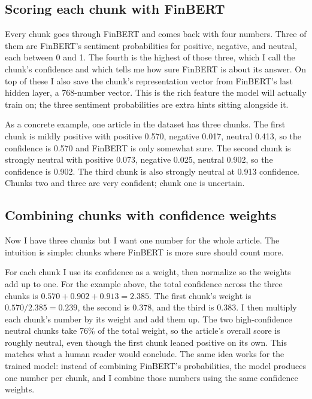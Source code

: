 \documentclass[11pt]{article}
\begin{document}
\subsection{Scoring each chunk with FinBERT}

Every chunk goes through FinBERT and comes back with four numbers. Three of them are FinBERT's sentiment probabilities for positive, negative, and neutral, each between 0 and 1. The fourth is the highest of those three, which I call the chunk's confidence and which tells me how sure FinBERT is about its answer. On top of these I also save the chunk's representation vector from FinBERT's last hidden layer, a 768-number vector. This is the rich feature the model will actually train on; the three sentiment probabilities are extra hints sitting alongside it.

As a concrete example, one article in the dataset has three chunks. The first chunk is mildly positive with positive 0.570, negative 0.017, neutral 0.413, so the confidence is 0.570 and FinBERT is only somewhat sure. The second chunk is strongly neutral with positive 0.073, negative 0.025, neutral 0.902, so the confidence is 0.902. The third chunk is also strongly neutral at 0.913 confidence. Chunks two and three are very confident; chunk one is uncertain.

\subsection{Combining chunks with confidence weights}

Now I have three chunks but I want one number for the whole article. The intuition is simple: chunks where FinBERT is more sure should count more.

For each chunk I use its confidence as a weight, then normalize so the weights add up to one. For the example above, the total confidence across the three chunks is $0.570 + 0.902 + 0.913 = 2.385$. The first chunk's weight is $0.570 / 2.385 = 0.239$, the second is $0.378$, and the third is $0.383$. I then multiply each chunk's number by its weight and add them up. The two high-confidence neutral chunks take 76\% of the total weight, so the article's overall score is roughly neutral, even though the first chunk leaned positive on its own. This matches what a human reader would conclude. The same idea works for the trained model: instead of combining FinBERT's probabilities, the model produces one number per chunk, and I combine those numbers using the same confidence weights.
\end{document}
